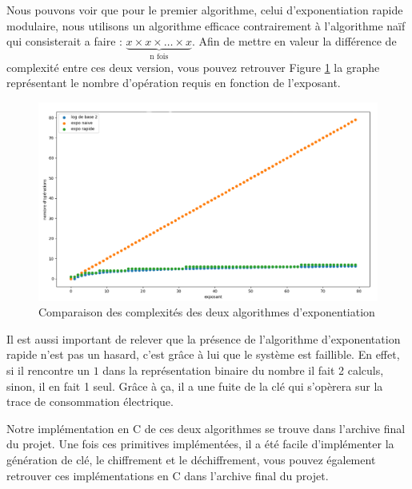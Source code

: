 Nous pouvons voir que pour le premier algorithme, celui d'exponentiation rapide modulaire, nous utilisons un algorithme efficace contrairement à l'algorithme naïf qui consisterait a faire : $\underbrace{x \times x \times \ldots \times x}_{\text{n fois}}$. Afin de mettre en valeur la différence de complexité entre ces deux version, vous pouvez retrouver Figure \ref{fig:diff_complexite} la graphe représentant le nombre d'opération requis en fonction de l'exposant.
\begin{figure}[H]
    \centering
    \includegraphics[width=\textwidth]{fig/diff_complexite.png}
    \caption{Comparaison des complexités des deux algorithmes d'exponentiation}
    \label{fig:diff_complexite}
\end{figure}
Il est aussi important de relever que la présence de l'algorithme d'exponentation rapide n'est pas un hasard, c'est grâce à lui que le système est faillible. En effet, si il rencontre un $1$ dans la représentation binaire du nombre il fait 2 calculs, sinon, il en fait 1 seul. Grâce à ça, il a une fuite de la clé qui s’opèrera sur la trace de consommation électrique.

Notre implémentation en C de ces deux algorithmes se trouve dans l'archive final du projet. Une fois ces primitives implémentées, il a été facile d'implémenter la génération de clé, le chiffrement et le déchiffrement, vous pouvez également retrouver ces implémentations en C dans l'archive final du projet.

